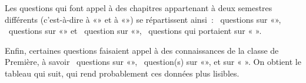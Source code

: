 \vspace*{-14pt}

Les questions qui font appel à des chapitres appartenant à deux semestres différents (c'est-à-dire à «\RS»{} et à «\HQ{}»{}) se répartissent ainsi~: ~questions sur «\EXSHV{}»{}, ~questions sur «\EXSHL{}»{} et ~question sur «\MMHV»{}, ~questions qui portaient sur « \ETACC{}»{}.

Enfin, certaines questions faisaient appel à des connaissances de la classe de Première, à savoir ~questions sur «\HVDMRC{}»{}, ~question(s) sur «\EXSPdP{}»{}, et  sur « \HLHA »{}. On obtient le tableau qui suit, qui rend probablement ces données plus lisibles.

\vspace*{-4pt}\renewcommand{\arraystretch}{1.3}
\setlength\extrarowheight{1pt}

